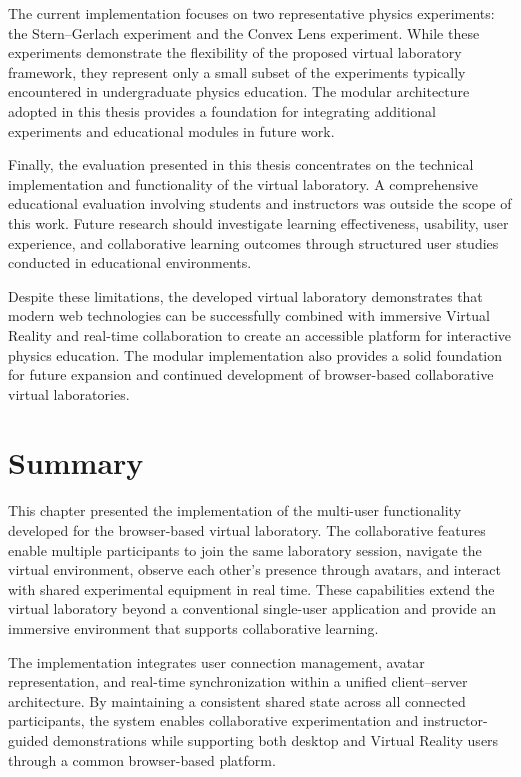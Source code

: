 The current implementation focuses on two representative physics experiments: the Stern--Gerlach experiment and the Convex Lens experiment. While these experiments demonstrate the flexibility of the proposed virtual laboratory framework, they represent only a small subset of the experiments typically encountered in undergraduate physics education. The modular architecture adopted in this thesis provides a foundation for integrating additional experiments and educational modules in future work.

Finally, the evaluation presented in this thesis concentrates on the technical implementation and functionality of the virtual laboratory. A comprehensive educational evaluation involving students and instructors was outside the scope of this work. Future research should investigate learning effectiveness, usability, user experience, and collaborative learning outcomes through structured user studies conducted in educational environments.

Despite these limitations, the developed virtual laboratory demonstrates that modern web technologies can be successfully combined with immersive Virtual Reality and real-time collaboration to create an accessible platform for interactive physics education. The modular implementation also provides a solid foundation for future expansion and continued development of browser-based collaborative virtual laboratories.

\section{Summary}

This chapter presented the implementation of the multi-user functionality developed for the browser-based virtual laboratory. The collaborative features enable multiple participants to join the same laboratory session, navigate the virtual environment, observe each other's presence through avatars, and interact with shared experimental equipment in real time. These capabilities extend the virtual laboratory beyond a conventional single-user application and provide an immersive environment that supports collaborative learning.

The implementation integrates user connection management, avatar representation, and real-time synchronization within a unified client--server architecture. By maintaining a consistent shared state across all connected participants, the system enables collaborative experimentation and instructor-guided demonstrations while supporting both desktop and Virtual Reality users through a common browser-based platform.

